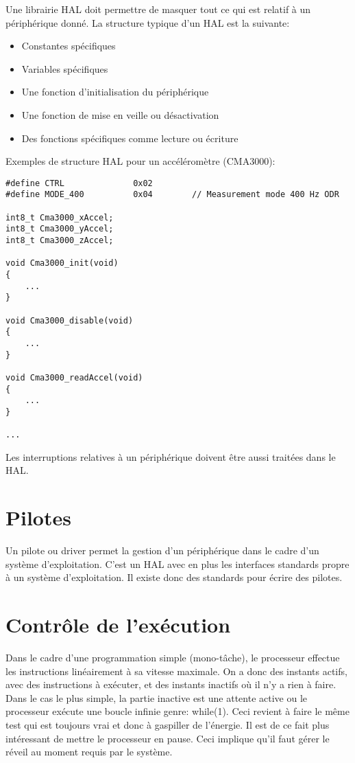 Une librairie HAL doit permettre de masquer tout ce qui est relatif à un périphérique donné. La structure typique d'un HAL est la suivante:
\begin{itemize}
\item Constantes spécifiques
\item Variables spécifiques
\item Une fonction d'initialisation du périphérique
\item Une fonction de mise en veille ou désactivation
\item Des fonctions spécifiques comme lecture ou écriture
\end{itemize}

Exemples de structure HAL pour un accéléromètre (CMA3000):
\lstset{style=customc}
\begin{lstlisting}
#define CTRL              0x02
#define MODE_400          0x04        // Measurement mode 400 Hz ODR

int8_t Cma3000_xAccel;
int8_t Cma3000_yAccel;
int8_t Cma3000_zAccel;

void Cma3000_init(void)
{
	...
}

void Cma3000_disable(void)
{
	...
}

void Cma3000_readAccel(void)
{
	...
} 

...
\end{lstlisting}

Les interruptions relatives à un périphérique doivent être aussi traitées dans le HAL.

\section{Pilotes}
Un pilote ou driver permet la gestion d'un périphérique dans le cadre d'un système d'exploitation. C'est un HAL avec en plus les interfaces standards propre à un système d'exploitation. Il existe donc des standards pour écrire des pilotes. 

\section{Contrôle de l'exécution}

Dans le cadre d'une programmation simple (mono-tâche), le processeur effectue les instructions linéairement à sa vitesse maximale. On a donc des instants actifs, avec des instructions à exécuter, et des instants inactifs où il n'y a rien à faire. Dans le cas le plus simple, la partie inactive est une attente active ou le processeur exécute une boucle infinie genre: while(1). Ceci revient à faire le même test qui est toujours vrai et donc à gaspiller de l'énergie. Il est de ce fait plus intéressant de mettre le processeur en pause. Ceci implique qu'il faut gérer le réveil au moment requis par le système.

